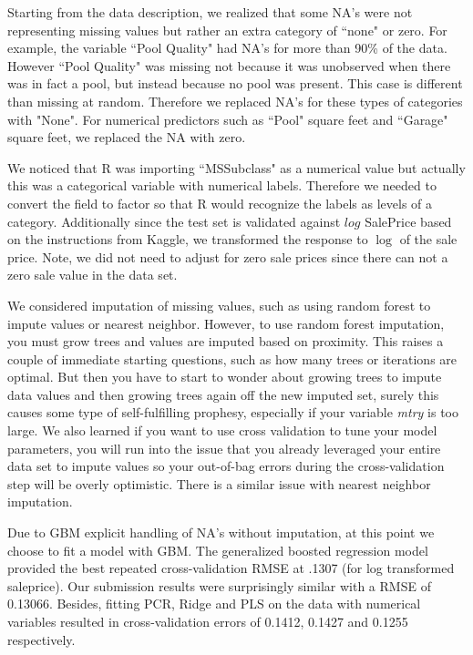 \documentclass[12pt]{article}
\newcommand{\thanh}[1]{#1}
\begin{document}
Starting from the data description, we realized that some NA's were not representing missing values but rather an extra category of ``none" or zero.  For example, the variable ``Pool Quality" had NA's for more than 90\% of the data.  However ``Pool Quality" was missing not because it was unobserved when there was in fact a pool, but instead because no pool was present.  This case is different than missing at random.  Therefore we replaced NA's for these types of categories with "None".  For numerical predictors such as ``Pool" square feet and ``Garage" square feet, we replaced the NA with zero.

We noticed that R was importing ``MSSubclass" as a numerical value but actually this was a categorical variable with numerical labels.  Therefore we needed to convert the field to factor so that R would recognize the labels as levels of a category.  Additionally since the test set is validated against $log$ SalePrice based on the instructions from Kaggle, we transformed the response to $\log$ of the sale price.  Note,  we did not need to adjust for zero sale prices since there can not a zero sale value in the data set.

We considered imputation of missing values, such as using random forest to impute values or nearest neighbor.  However, to use random forest imputation, you must grow trees and values are imputed based on proximity. This raises a couple of immediate starting questions, such as how many trees or iterations are optimal.  But then you have to start to wonder about growing trees to impute data values and then growing trees again off the new imputed set, surely this causes some type of self-fulfilling prophesy, especially if your variable \emph{mtry} is too large. We also learned if you want to use cross validation to tune your model parameters, you will run into the issue that you already leveraged your entire data set to impute values so your out-of-bag errors during the cross-validation step will be overly optimistic.  There is a similar issue with nearest neighbor imputation.

Due to GBM explicit handling of NA's without imputation, at this point we choose to fit a model with GBM.  The generalized boosted regression model provided the best repeated cross-validation RMSE at .1307 (for log transformed saleprice). Our submission results were surprisingly similar with a RMSE of 0.13066. %
\thanh{Besides, fitting PCR, Ridge and PLS on the data with numerical variables resulted in cross-validation errors of 0.1412, 0.1427 and 0.1255 respectively.}
\end{document}
